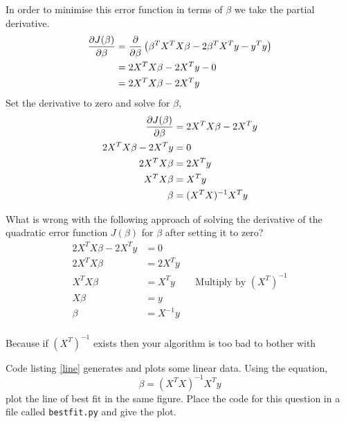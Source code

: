 \documentclass{homework}
\begin{document}
In order to minimise this error function in terms of $\beta$ we take
the partial derivative.
\begin{align*}
  \frac{\partial J(\beta)}{\partial \beta}
   & = \frac{\partial}{\partial \beta}\left(\beta^TX^TX\beta - 2\beta^TX^Ty - y^Ty\right) \\
   & = 2X^TX\beta - 2X^Ty - 0                                            \\
   & = 2X^TX\beta - 2X^Ty
\end{align*}
Set the derivative to zero and solve for $\beta$,
\begin{align*}
  \frac{\partial J(\beta)}{\partial \beta} & = 2X^TX\beta - 2X^Ty \\
  2X^TX\beta - 2X^Ty           & = 0                  \\
  2X^TX\beta                   & = 2X^Ty              \\
  X^TX\beta                    & = X^Ty               \\
  \beta                        & = (X^TX)^{-1}X^Ty    \\
\end{align*}

\question What is wrong with the following approach of solving the
derivative of the quadratic error function $J(\beta)$ for $\beta$
after setting it to zero?
\begin{align*}
  2X^TX\beta - 2X^Ty & = 0                                           \\
  2X^TX\beta         & = 2X^Ty                                       \\
  X^TX\beta          & = X^Ty    &  & \text{Multiply by } (X^T)^{-1} \\
  X\beta             & = y                                           \\
  \beta              & = X^{-1}y                                     \\
\end{align*}

\begin{sol}
  Because if $(X^T)^{-1}$ exists then your algorithm is too bad to bother with
\end{sol}

\question Code listing \ref{line} generates and plots some linear
data. Using the equation,
\[
  \beta = (X^TX)^{-1}X^Ty
\]
plot the line of best fit in the same figure. Place the code for this
question in a file called \texttt{bestfit.py} and give the plot.

% 
\end{document}
